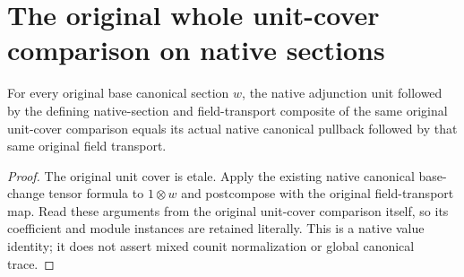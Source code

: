 \section{The original whole unit-cover comparison on native sections}

\begin{lemma}
\label{lem:kn-unit-original-native-value}
\leanok
For every original base canonical section $w$, the native adjunction unit
followed by the defining native-section and field-transport composite of
the same original unit-cover comparison equals its actual native canonical
pullback followed by that same original field transport.
\end{lemma}
\begin{proof}
The original unit cover is etale. Apply the existing native canonical
base-change tensor formula to $1\otimes w$ and postcompose with the
original field-transport map. Read these arguments from the original
unit-cover comparison itself, so its coefficient and module instances
are retained literally. This is a native value identity; it does not
assert mixed counit normalization or global canonical trace.
\end{proof}
